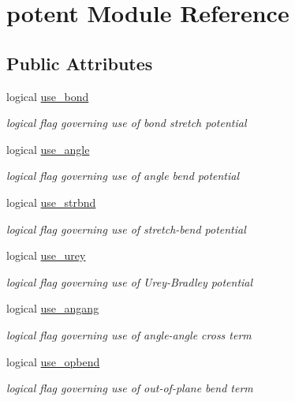 \hypertarget{classpotent}{\section{potent Module Reference}
\label{classpotent}
}
\subsection*{Public Attributes}
\begin{DoxyCompactItemize}
\item 
logical \hyperlink{classpotent_a901c84bd1620b837b397b5a27333183f}{use\-\_\-bond}
\begin{DoxyCompactList}\small\item\em logical flag governing use of bond stretch potential \end{DoxyCompactList}\item 
logical \hyperlink{classpotent_a23350abb90bb736d08920da956e9eef1}{use\-\_\-angle}
\begin{DoxyCompactList}\small\item\em logical flag governing use of angle bend potential \end{DoxyCompactList}\item 
logical \hyperlink{classpotent_a75d75048b13b8eaf16d15061071a2baf}{use\-\_\-strbnd}
\begin{DoxyCompactList}\small\item\em logical flag governing use of stretch-\/bend potential \end{DoxyCompactList}\item 
logical \hyperlink{classpotent_a18c9c260e77b68f309216aad1b51e04e}{use\-\_\-urey}
\begin{DoxyCompactList}\small\item\em logical flag governing use of Urey-\/\-Bradley potential \end{DoxyCompactList}\item 
logical \hyperlink{classpotent_a77de48b809f305bc091a799a5c724c04}{use\-\_\-angang}
\begin{DoxyCompactList}\small\item\em logical flag governing use of angle-\/angle cross term \end{DoxyCompactList}\item 
logical \hyperlink{classpotent_a54b92cefe4749a50e302156f63ed7219}{use\-\_\-opbend}
\begin{DoxyCompactList}\small\item\em logical flag governing use of out-\/of-\/plane bend term \end{DoxyCompactList}\item 

\end{DoxyCompactItemize}
